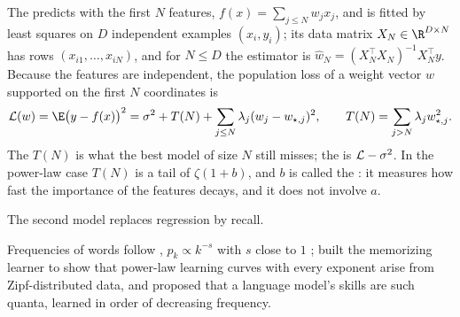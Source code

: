 \begin{refsection}
The  predicts with the first $N$ features, $f(x)=\sum_{j\le N}w_jx_j$, and is fitted by least squares on $D$ independent examples $(x_i,y_i)$; its data matrix $X_N\in\R^{D\times N}$ has rows $(x_{i1},\dots,x_{iN})$, and for $N\le D$ the estimator is $\hat w_N=(X_N^\top X_N)^{-1}X_N^\top y$. Because the features are independent, the population loss of a weight vector $w$ supported on the first $N$ coordinates is
\begin{equation}\label{eq:scaling:loss}
  \Loss(w)=\E\bigl(y-f(x)\bigr)^2=\sigma^2+T(N)+\sum_{j\le N}\lambda_j(w_j-w_{\star,j})^2,\qquad T(N)=\sum_{j>N}\lambda_jw_{\star,j}^2 .
\end{equation}
The  $T(N)$ is what the best model of size $N$ still misses; the  is $\mathcal{L}-\sigma^2$. In the power-law case $T(N)$ is a tail of $\zeta(1+b)$, and $b$ is called the : it measures how fast the importance of the features decays, and it does not involve $a$.

The second model replaces regression by recall.


Frequencies of words follow , $p_k\propto k^{-s}$ with $s$ close to $1$ \parencite{Zipf1949}; \textcite{Hutter2021} built the memorizing learner to show that power-law learning curves with every exponent arise from Zipf-distributed data, and \textcite{MichaudEtAl2023} proposed that a language model's skills are such quanta, learned in order of decreasing frequency.


\end{refsection}
